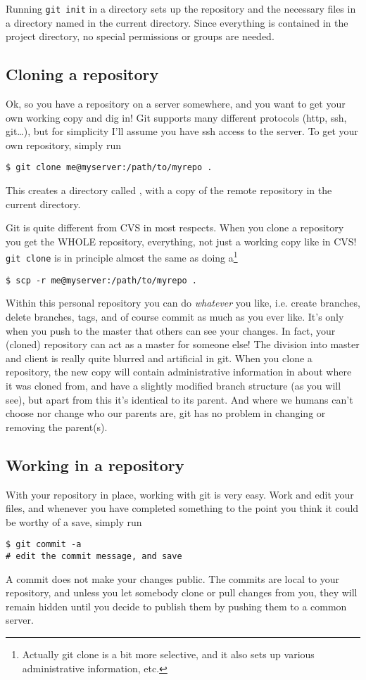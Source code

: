 \documentclass[a4paper,10pt]{article}
\begin{document}
Running \texttt{git init} in a directory sets up the repository and the
necessary files in a directory named  in the current directory.
Since everything is contained in the project directory, no special permissions
or groups are needed. 

\subsection{Cloning a repository}
Ok, so you have a repository on a server somewhere, and you want to get your own
working copy and dig in! Git supports many different protocols (http, ssh,
git\ldots), but for simplicity I'll assume you have ssh access to the server.
To get your own repository, simply run
\begin{verbatim}
$ git clone me@myserver:/path/to/myrepo .
\end{verbatim}
This creates a directory called , with a copy of the remote
repository in the current directory.

Git is quite different from CVS in most respects. When you clone a repository
you get the WHOLE repository, everything, not just a working copy like in CVS!
\texttt{git clone} is in principle almost the same as doing a\footnote{
Actually git clone is a bit more selective, and it also sets up various
administrative information, etc.} 
\begin{verbatim}
$ scp -r me@myserver:/path/to/myrepo .
\end{verbatim}
Within this personal repository you can do \textit{whatever} you like, i.e.
create branches, delete branches, tags, and of course commit as much as you
ever like. It's only when you push to the master that others can see your
changes.  In fact, your (cloned) repository can act as a master for someone
else! The division into master and client is really quite blurred and
artificial in git.  When you clone a repository, the new copy will contain
administrative information in  about where it was cloned from, and
have a slightly modified branch structure (as you will see), but apart from
this it's identical to its parent. And where we humans can't choose nor
change who our parents are, git has no problem in changing or removing the
parent(s).

\subsection{Working in a repository}
With your repository in place, working with git is very easy. Work and edit
your files, and whenever you have completed something to the point you think
it could be worthy of a save, simply run
\begin{verbatim}
$ git commit -a
# edit the commit message, and save
\end{verbatim}
A commit does not make your changes public. The commits are local to your
repository, and unless you let somebody clone or pull changes from you,
they will remain hidden until you decide to publish them by pushing them
to a common server.
\end{document}
